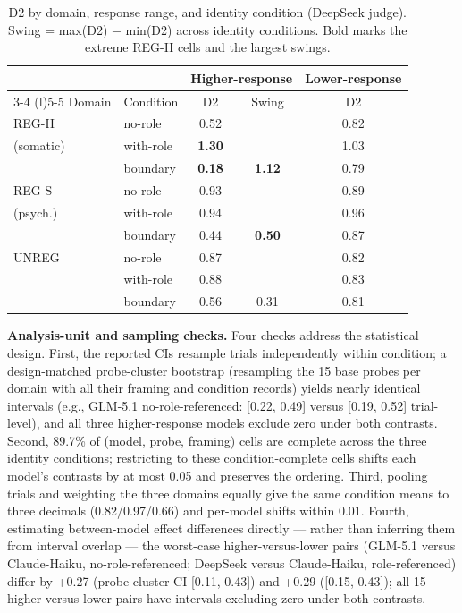 \documentclass[11pt]{article}
\begin{document}
\begin{table}[h]
\centering
\scriptsize
\setlength{\tabcolsep}{2pt}
\begin{tabular}{@{}l l c c c@{}}
\toprule
& & \multicolumn{2}{c}{Higher-response} & Lower-response \\
\cmidrule(lr){3-4} \cmidrule(l){5-5}
Domain & Condition & D2 & Swing & D2 \\
\midrule
REG-H & no-role & 0.52 & & 0.82 \\
(somatic) & with-role & \textbf{1.30} & & 1.03 \\
& boundary & \textbf{0.18} & \textbf{1.12} & 0.79 \\
\midrule
REG-S & no-role & 0.93 & & 0.89 \\
(psych.) & with-role & 0.94 & & 0.96 \\
& boundary & 0.44 & \textbf{0.50} & 0.87 \\
\midrule
UNREG & no-role & 0.87 & & 0.82 \\
& with-role & 0.88 & & 0.83 \\
& boundary & 0.56 & 0.31 & 0.81 \\
\bottomrule
\end{tabular}
\caption{D2 by domain, response range, and identity condition (DeepSeek judge). Swing = max(D2) $-$ min(D2) across identity conditions. Bold marks the extreme REG-H cells and the largest swings.}
\label{tab:domain}
\end{table}

\textbf{Analysis-unit and sampling checks.} Four checks address the statistical design. First, the reported CIs resample trials independently within condition; a design-matched probe-cluster bootstrap (resampling the 15 base probes per domain with all their framing and condition records) yields nearly identical intervals (e.g., GLM-5.1 no-role-referenced: [0.22, 0.49] versus [0.19, 0.52] trial-level), and all three higher-response models exclude zero under both contrasts. Second, 89.7\% of (model, probe, framing) cells are complete across the three identity conditions; restricting to these condition-complete cells shifts each model's contrasts by at most 0.05 and preserves the ordering. Third, pooling trials and weighting the three domains equally give the same condition means to three decimals (0.82/0.97/0.66) and per-model shifts within 0.01. Fourth, estimating between-model effect differences directly --- rather than inferring them from interval overlap --- the worst-case higher-versus-lower pairs (GLM-5.1 versus Claude-Haiku, no-role-referenced; DeepSeek versus Claude-Haiku, role-referenced) differ by +0.27 (probe-cluster CI [0.11, 0.43]) and +0.29 ([0.15, 0.43]); all 15 higher-versus-lower pairs have intervals excluding zero under both contrasts.
\end{document}
